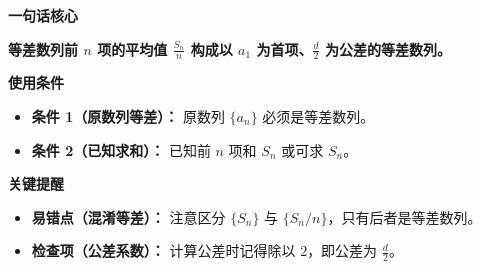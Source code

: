 \begin{summarybox}
	\textbf{\textcolor{CSummary}{一句话核心}}

	\textbf{等差数列前 $n$ 项的平均值 $\frac{S_n}{n}$ 构成以 $a_1$ 为首项、$\frac{d}{2}$ 为公差的等差数列。}

	\medskip
	\textbf{\textcolor{CSummary}{使用条件}}
	\begin{itemize}[leftmargin=*, itemsep=0.5em, topsep=0.4em]
		\item \textbf{条件 1（原数列等差）：} 原数列 $\{a_n\}$ 必须是等差数列。
		\item \textbf{条件 2（已知求和）：} 已知前 $n$ 项和 $S_n$ 或可求 $S_n$。
	\end{itemize}

	\medskip
	\textbf{\textcolor{CSummary}{关键提醒}}
	\begin{itemize}[leftmargin=*, itemsep=0.5em, topsep=0.4em]
		\item \textbf{易错点（混淆等差）：} 注意区分 $\{S_n\}$ 与 $\{S_n/n\}$，只有后者是等差数列。
		\item \textbf{检查项（公差系数）：} 计算公差时记得除以 $2$，即公差为 $\frac{d}{2}$。
	\end{itemize}
\end{summarybox}
